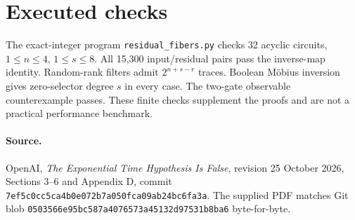 \documentclass[11pt]{article}
\begin{document}
\section{Executed checks}
The exact-integer program \texttt{residual\_fibers.py} checks 32 acyclic
circuits, $1\le n\le4$, $1\le s\le8$. All 15,300 input/residual pairs pass
the inverse-map identity. Random-rank filters admit $2^{n+s-r}$ traces.
Boolean M\"obius inversion gives zero-selector degree $s$ in every case.
The two-gate observable counterexample passes. These finite checks supplement
the proofs and are not a practical performance benchmark.

\paragraph{Source.} OpenAI, \emph{The Exponential Time Hypothesis Is False},
revision 25 October 2026, Sections 3--6 and Appendix D, commit
\texttt{7ef5c0cc5ca4b0e072b7a050fca09ab24bc6fa3a}.
The supplied PDF matches Git blob
\texttt{0503566e95bc587a4076573a45132d97531b8ba6} byte-for-byte.
\end{document}
